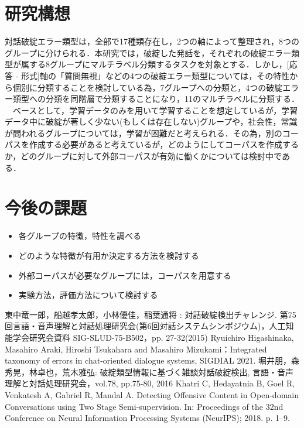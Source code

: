 \documentclass[upLaTex, 10pt,dvipdfmx,a4paper,twocolumn]{jsarticle}
\begin{document}
\section{研究構想}
    対話破綻エラー類型は，全部で17種類存在し，2つの軸によって整理され，8つのグループに分けられる．本研究では，破綻した発話を，それぞれの破綻エラー類型が属する8グループにマルチラベル分類するタスクを対象とする．しかし，[応答 - 形式]軸の「質問無視」などの4つの破綻エラー類型については，その特性から個別に分類することを検討している為，7グループへの分類と，4つの破綻エラー類型への分類を同階層で分類することになり，11のマルチラベルに分類する．\\
    　ベースとして，学習データのみを用いて学習することを想定しているが，学習データ中に破綻が著しく少ない(もしくは存在しない)グループや，社会性，常識が問われるグループについては，学習が困難だと考えられる．その為，別のコーパスを作成する必要があると考えているが，どのようにしてコーパスを作成するか，どのグループに対して外部コーパスが有効に働くかについては検討中である．

\section{今後の課題}
 \begin{itemize}
     \item 各グループの特徴，特性を調べる
     \item どのような特徴が有用か決定する方法を検討する
     \item 外部コーパスが必要なグループには，コーパスを用意する
     \item 実験方法，評価方法について検討する
 \end{itemize} 

 
 
\begin{thebibliography}{99}
     東中竜一郎，船越孝太郎，小林優佳，稲葉通将 : 対話破綻検出チャレンジ. 第75回言語・音声理解と対話処理研究会(第6回対話システムシンポジウム)，人工知能学会研究会資料 SIG-SLUD-75-B502，pp. 27-32(2015)
     Ryuichiro Higashinaka, Masahiro Araki, Hiroshi Tsukahara and Masahiro Mizukami：Integrated taxonomy of errors in chat-oriented dialogue systems,  SIGDIAL 2021.
     堀井朋，森秀晃，林卓也，荒木雅弘: 破綻類型情報に基づく雑談対話破綻検出, 言語・音声理解と対話処理研究会，vol.78, pp.75-80, 2016
    Khatri C, Hedayatnia B, Goel R, Venkatesh A, Gabriel R, Mandal A. Detecting Offensive Content in Open-domain Conversations using Two Stage Semi-supervision. In: Proceedings of the 32nd Conference on Neural Information Processing Systems (NeurIPS); 2018. p. 1–9. 

\end{thebibliography}
\end{document}
